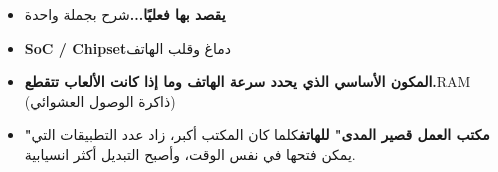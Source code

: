 
\begin{itemize}
  \item \textbf{يقصد بها فعليًا...}شرح بجملة واحدة
  \item \textbf{SoC / Chipset}دماغ وقلب الهاتف
  \item \textbf{المكون الأساسي الذي يحدد سرعة الهاتف وما إذا كانت الألعاب تتقطع.}RAM (ذاكرة الوصول العشوائي)
  \item \textbf{"مكتب العمل قصير المدى" للهاتف}كلما كان المكتب أكبر، زاد عدد التطبيقات التي يمكن فتحها في نفس الوقت، وأصبح التبديل أكثر انسيابية.
\end{itemize}
